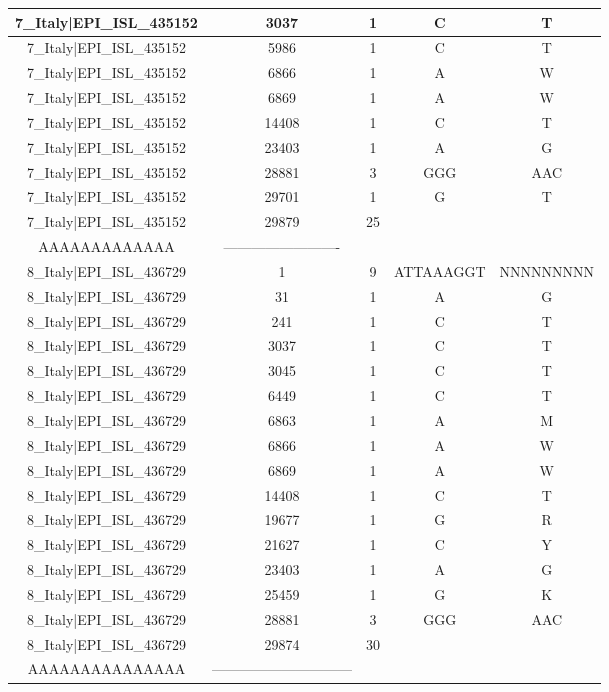\documentclass[a4paper,10pt]{article}
\begin{document}
\begin{longtable}{@{}ccccc@{}}
7\_Italy|EPI\_ISL\_435152 & 3037 & 1 & C & T \\* \midrule
7\_Italy|EPI\_ISL\_435152 & 5986 & 1 & C & T \\* \midrule
7\_Italy|EPI\_ISL\_435152 & 6866 & 1 & A & W \\* \midrule
7\_Italy|EPI\_ISL\_435152 & 6869 & 1 & A & W \\* \midrule
7\_Italy|EPI\_ISL\_435152 & 14408 & 1 & C & T \\* \midrule
7\_Italy|EPI\_ISL\_435152 & 23403 & 1 & A & G \\* \midrule
7\_Italy|EPI\_ISL\_435152 & 28881 & 3 & GGG & AAC \\* \midrule
7\_Italy|EPI\_ISL\_435152 & 29701 & 1 & G & T \\* \midrule
7\_Italy|EPI\_ISL\_435152 & 29879 & 25 & \begin{tabular}[c]{@{}c@{}}AAAAAAAAAAAA\\ AAAAAAAAAAAAA\end{tabular} & ------------------------- \\* \midrule
8\_Italy|EPI\_ISL\_436729 & 1 & 9 & ATTAAAGGT & NNNNNNNNN \\* \midrule
8\_Italy|EPI\_ISL\_436729 & 31 & 1 & A & G \\* \midrule
8\_Italy|EPI\_ISL\_436729 & 241 & 1 & C & T \\* \midrule
8\_Italy|EPI\_ISL\_436729 & 3037 & 1 & C & T \\* \midrule
8\_Italy|EPI\_ISL\_436729 & 3045 & 1 & C & T \\* \midrule
8\_Italy|EPI\_ISL\_436729 & 6449 & 1 & C & T \\* \midrule
8\_Italy|EPI\_ISL\_436729 & 6863 & 1 & A & M \\* \midrule
8\_Italy|EPI\_ISL\_436729 & 6866 & 1 & A & W \\* \midrule
8\_Italy|EPI\_ISL\_436729 & 6869 & 1 & A & W \\* \midrule
8\_Italy|EPI\_ISL\_436729 & 14408 & 1 & C & T \\* \midrule
8\_Italy|EPI\_ISL\_436729 & 19677 & 1 & G & R \\* \midrule
8\_Italy|EPI\_ISL\_436729 & 21627 & 1 & C & Y \\* \midrule
8\_Italy|EPI\_ISL\_436729 & 23403 & 1 & A & G \\* \midrule
8\_Italy|EPI\_ISL\_436729 & 25459 & 1 & G & K \\* \midrule
8\_Italy|EPI\_ISL\_436729 & 28881 & 3 & GGG & AAC \\* \midrule
8\_Italy|EPI\_ISL\_436729 & 29874 & 30 & \begin{tabular}[c]{@{}c@{}}AAAAAAAAAAAAAAA\\ AAAAAAAAAAAAAAA\end{tabular} & ------------------------------ \\* \bottomrule
\end{longtable}
\end{document}
